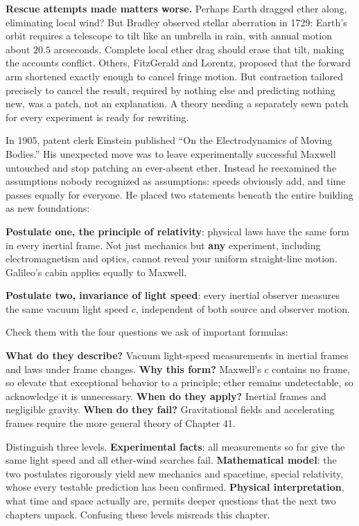 \textbf{Rescue attempts made matters worse.} Perhaps Earth dragged ether along, eliminating local wind? But Bradley observed stellar aberration in 1729: Earth's orbit requires a telescope to tilt like an umbrella in rain, with annual motion about \(20.5\) arcseconds. Complete local ether drag should erase that tilt, making the accounts conflict. Others, FitzGerald and Lorentz, proposed that the forward arm shortened exactly enough to cancel fringe motion. But contraction tailored precisely to cancel the result, required by nothing else and predicting nothing new, was a patch, not an explanation. A theory needing a separately sewn patch for every experiment is ready for rewriting.


In 1905, patent clerk Einstein published ``On the Electrodynamics of Moving Bodies.'' His unexpected move was to leave experimentally successful Maxwell untouched and stop patching an ever-absent ether. Instead he reexamined the assumptions nobody recognized as assumptions: speeds obviously add, and time passes equally for everyone. He placed two statements beneath the entire building as new foundations:

\textbf{Postulate one, the principle of relativity}: physical laws have the same form in every inertial frame. Not just mechanics but \textbf{any} experiment, including electromagnetism and optics, cannot reveal your uniform straight-line motion. Galileo's cabin applies equally to Maxwell.

\textbf{Postulate two, invariance of light speed}: every inertial observer measures the same vacuum light speed \(c\), independent of both source and observer motion.

Check them with the four questions we ask of important formulas:

\textbf{What do they describe?} Vacuum light-speed measurements in inertial frames and laws under frame changes. \textbf{Why this form?} Maxwell's \(c\) contains no frame, so elevate that exceptional behavior to a principle; ether remains undetectable, so acknowledge it is unnecessary. \textbf{When do they apply?} Inertial frames and negligible gravity. \textbf{When do they fail?} Gravitational fields and accelerating frames require the more general theory of Chapter 41.

Distinguish three levels. \textbf{Experimental facts}: all measurements so far give the same light speed and all ether-wind searches fail. \textbf{Mathematical model}: the two postulates rigorously yield new mechanics and spacetime, special relativity, whose every testable prediction has been confirmed. \textbf{Physical interpretation}, what time and space actually are, permits deeper questions that the next two chapters unpack. Confusing these levels misreads this chapter.

